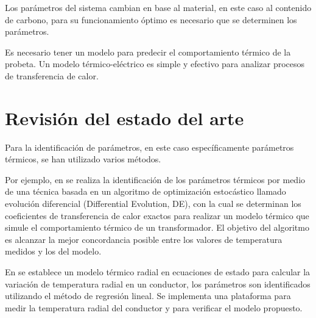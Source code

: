 Los parámetros del sistema cambian en base al material, en este caso al contenido de carbono, para su funcionamiento óptimo es necesario que se determinen los parámetros.






Es necesario tener un modelo para predecir el comportamiento térmico de la probeta. Un modelo térmico-eléctrico es simple y efectivo para analizar procesos de transferencia de calor.













\section{Revisión del estado del arte}


Para la identificación de parámetros,  en este caso específicamente parámetros térmicos, se han utilizado varios métodos.

 Por ejemplo, en \cite{FEMGlotic2000} se realiza la identificación de los parámetros térmicos por medio de una técnica basada en un algoritmo de optimización estocástico llamado evolución diferencial (Differential Evolution, DE), con la cual se determinan los coeficientes de transferencia de calor exactos para realizar un modelo térmico que simule el comportamiento térmico de un transformador.   
 El objetivo del algoritmo es  alcanzar la mejor concordancia posible entre los valores de temperatura medidos y los del modelo. 

En \cite{RadialFeng2015} se establece
un modelo térmico radial en ecuaciones de estado para calcular la variación de temperatura radial en un conductor, los parámetros son identificados utilizando el método de regresión lineal. Se implementa una plataforma para medir la temperatura radial del conductor y para verificar el modelo propuesto.

